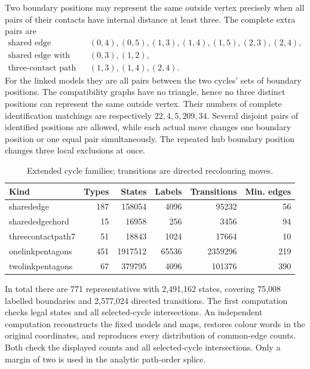 Two boundary positions may represent the same outside vertex precisely when all pairs of their contacts
have internal distance at least three. The complete extra pairs are
\[
\begin{array}{cl}
\text{shared edge}&(0,4),(0,5),(1,3),(1,4),(1,5),(2,3),(2,4),\\
\text{shared edge with chord}&(0,3),(1,2),\\
\text{three-contact path}&(1,3),(1,4),(2,4).
\end{array}
\]
For the linked models they are all pairs between the two cycles'
sets of boundary positions. The compatibility graphs have no triangle, hence no
three distinct positions can represent the same outside vertex. Their numbers of complete identification
matchings are respectively $22,4,5,209,34$. Several disjoint pairs of identified positions
are allowed, while each actual move changes one boundary position or one equal
pair simultaneously. The repeated hub boundary position changes three local
exclusions at once.

\begin{table}[htbp]
\centering\small
\caption{Extended cycle families; transitions are directed recolouring moves.}
\label{tab:extended-cycle-counts}
\begin{tabular}{lrrrrr}
\toprule
Kind & Types & States & Labels & Transitions & Min. edges\\
\midrule
sharededge&187&158054&4096&95232&56\\
sharededgechord&15&16958&256&3456&94\\
threecontactpath7&51&18843&1024&17664&10\\
onelinkpentagons&451&1917512&65536&2359296&219\\
twolinkpentagons&67&379795&4096&101376&390\\
\bottomrule
\end{tabular}
\end{table}

In total there are 771 representatives with 2,491,162 states, covering
75,008 labelled boundaries and 2,577,024 directed transitions.
The first computation checks legal states and all selected-cycle
intersections. An independent computation reconstructs the fixed models and
maps, restores colour words in the original coordinates, and reproduces every distribution of common-edge counts. Both check the displayed counts and all selected-cycle
intersections.
Only a margin of two is used in the analytic path-order splice.

